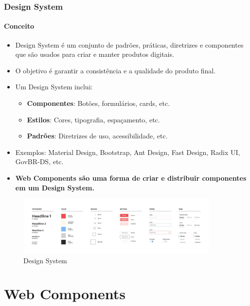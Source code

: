 \documentclass[
	9pt, %
	t, %
]{beamer}
\newcommand{\yellowbox}[1]{\colorbox{yellow!75}{#1}}
\begin{document}
\begin{frame}
	\frametitle{Design System}
	\framesubtitle{Conceito}

	\begin{itemize}
		\item Design System é um conjunto de \yellowbox{padrões, práticas, diretrizes e componentes} que são usados para criar e manter produtos digitais.
		\item O objetivo é garantir a consistência e a qualidade do produto final.
		\item Um Design System inclui:
		\begin{itemize}
			\item \textbf{Componentes}: Botões, formulários, cards, etc.
			\item \textbf{Estilos}: Cores, tipografia, espaçamento, etc.
			\item \textbf{Padrões}: Diretrizes de uso, acessibilidade, etc.
		\end{itemize}
		\item Exemplos: Material Design, Bootstrap, Ant Design, Fast Design, Radix UI, GovBR-DS, etc.
		\item \textbf{Web Components são uma forma de criar e distribuir componentes em um Design System.}
	\end{itemize}

	\begin{figure}
		\centering
		\includegraphics[width=0.9\textwidth]{design_system.jpg}
		\caption{Design System}
	\end{figure}

\end{frame}

\section{Web Components}
\end{document}
